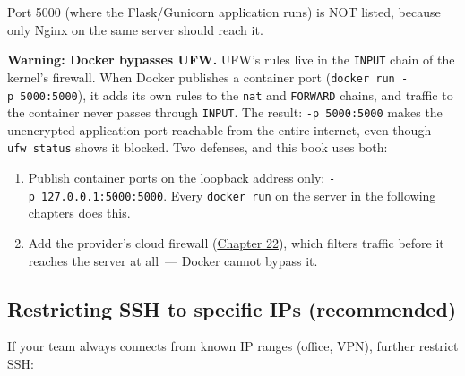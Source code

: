 \noindent{}Port 5000 (where the Flask/Gunicorn application runs) is NOT listed, because only Nginx on the same server should reach it.

\begin{warnbox}

\textbf{Warning: Docker bypasses UFW.} UFW's rules live in the \texttt{INPUT} chain of the kernel's firewall. When Docker publishes a container port (\texttt{docker\ run\ -p\ 5000:5000}), it adds its own rules to the \texttt{nat} and \texttt{FORWARD} chains, and traffic to the container never passes through \texttt{INPUT}. The result: \texttt{-p\ 5000:5000} makes the unencrypted application port reachable from the entire internet, even though \texttt{ufw\ status} shows it blocked. Two defenses, and this book uses both:

\begin{enumerate}
\def\labelenumi{\arabic{enumi}.}
\tightlist
\item
  Publish container ports on the loopback address only: \texttt{-p\ 127.0.0.1:5000:5000}. Every \texttt{docker\ run} on the server in the following chapters does this.
\item
  Add the provider's cloud firewall (\hyperref[ch:22-network-configuration]{Chapter 22}), which filters traffic before it reaches the server at all~--- Docker cannot bypass it.
\end{enumerate}

\end{warnbox}

\subsection*{Restricting SSH to specific IPs (recommended)}\label{21-system-setup:restricting-ssh-to-specific-ips-recommended}

If your team always connects from known IP ranges (office, VPN), further restrict SSH:

\begin{codebox}[short]

\begin{Shaded}
\begin{Highlighting}[]


\end{Highlighting}
\end{Shaded}

\end{codebox}

